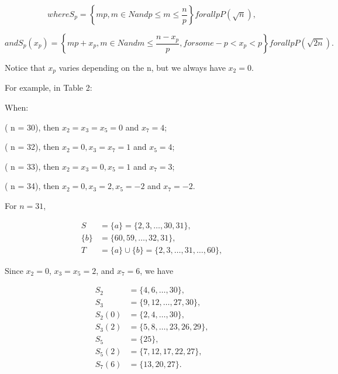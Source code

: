 \documentclass{article}
\begin{document}
\begin{equation}
 where      S_{p} =\left\{  mp,  m\in N  and  p\leq m\leq \frac{n}{p}\right\}      for all   pP\left(\sqrt{n}\right),
\end{equation}


\begin{equation}
and        S_{p}\left(x_{p}\right) =\left\{  mp+x_{p},  m\in N  and  m\leq \frac{n-x_{p}}{p},  for some -p<x_{p}<p\right\}   for all   pP(\sqrt{2n}).  
\end{equation}

\vspace{1\baselineskip}

Notice that \( x_{p}\) varies depending on the n, but we always have \( x_{2 } = 0\).
\vspace{1\baselineskip}

For example, in Table 2:
\vspace{1\baselineskip}
 
When:
\vspace{1\baselineskip}
\begin{center}
    

( n = 30), then \( x_{2 } = x_{3 } = x_{5 } = 0\) and \( x_{7 } = 4\);

( n = 32), then \( x_{2 } = 0,  x_{3 } = x_{7 } = 1\) and \( x_{5 } = 4\);

( n = 33), then \( x_{2 } = x_{3 } = 0,  x_{5 } = 1\) and \( x_{7 } = 3\);

( n = 34), then \( x_{2 } = 0,  x_{3 } = 2,  x_{5 } = -2\) and \( x_{7 } = -2.\)

\end{center}

 \vspace{1\baselineskip}

For \( n = 31 \),

\begin{align}
S &= \{ a \} = \{ 2,3,\ldots,30,31 \}, \\
\{ b \} &= \{ 60,59,\ldots,32,31 \}, \\
T &= \{ a \} \cup \{ b \} = \{ 2,3,\ldots,31,\ldots,60 \},
\end{align}

\vspace{1\baselineskip}

Since \( x_{2} = 0 \), \( x_{3} = x_{5} = 2 \), and \( x_{7} = 6 \), we have

\begin{align}
S_{2} &= \{ 4, 6, \ldots, 30 \}, \\
S_{3} &= \{ 9, 12, \ldots, 27, 30 \}, \\
S_{2}(0) &= \{ 2, 4, \ldots, 30 \}, \\
S_{3}(2) &= \{ 5, 8, \ldots, 23, 26, 29 \}, \\
S_{5} &= \{ 25 \}, \\
S_{5}(2) &= \{ 7, 12, 17, 22, 27 \}, \\
S_{7}(6) &= \{ 13, 20, 27 \}.
\end{align}
\end{document}
